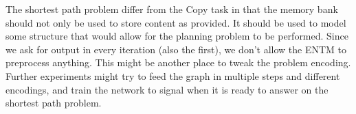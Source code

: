 \newpar The shortest path problem differ from the Copy task in that the memory bank should not only be used to store content as provided. It should be used to model some structure that would allow for the planning problem to be performed. Since we ask for output in every iteration (also the first), we don't allow the ENTM to preprocess anything. This might be another place to tweak the problem encoding. Further experiments might try to feed the graph in multiple steps and different encodings, and train the network to signal when it is ready to answer on the shortest path problem.